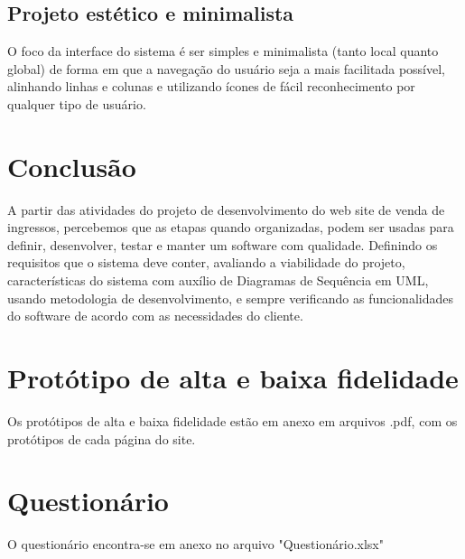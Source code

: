 \documentclass[12pt]{article}
\begin{document}
\subsection{Projeto estético e minimalista}
O foco da interface do sistema é ser simples e minimalista (tanto local quanto global) de forma em que a navegação do usuário seja a mais facilitada possível, alinhando linhas e colunas e utilizando ícones de fácil reconhecimento por qualquer tipo de usuário.

     
\section{Conclusão}
A partir das atividades do projeto de desenvolvimento do web site de venda de ingressos, percebemos que as etapas quando organizadas, podem ser usadas para definir, desenvolver, testar e manter um software com qualidade. Definindo os requisitos que o sistema deve conter, avaliando a viabilidade do projeto, características do sistema com auxílio de Diagramas de Sequência em UML, usando metodologia de desenvolvimento, e sempre verificando as funcionalidades do software de acordo com as necessidades do cliente.

\section{Protótipo de alta e baixa fidelidade}
Os protótipos de alta e baixa fidelidade estão em anexo em arquivos .pdf, com os protótipos de cada página do site.

\section{Questionário}
O questionário encontra-se em anexo no arquivo "Questionário.xlsx"

\nocite{*}


\end{document}
